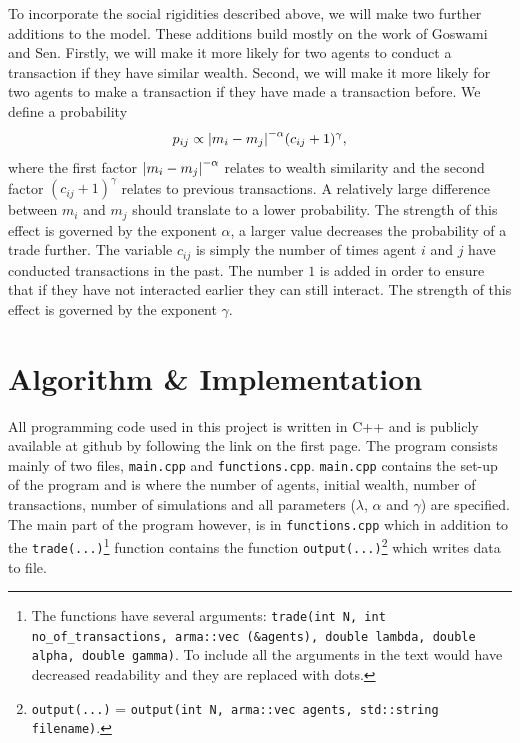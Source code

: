 \documentclass[10pt, a4paper]{amsart}
\begin{document}
To incorporate the social rigidities described above, we will make two further additions to the model. These additions build mostly on the work of Goswami and Sen\cite{GoswamiSen}. Firstly, we will make it more likely for two agents to conduct a transaction if they have similar wealth. Second, we will make it more likely for two agents to make a transaction if they have made a transaction before. We define a probability
\begin{equation}
\label{eq:rigidprob}
p_{ij} \propto \abs{m_i - m_j}^{-\alpha}(c_{ij}+1)^{\gamma},
\end{equation}
where the first factor $\abs{m_i-m_j}^{-\alpha}$ relates to wealth similarity and the second factor $(c_{ij}+1)^{\gamma}$ relates to previous transactions. A relatively large difference between $m_i$ and $m_j$ should translate to a lower probability. The strength of this effect is governed by the exponent $\alpha$, a larger value decreases the probability of a trade further. The variable $c_{ij}$ is simply the number of times agent $i$ and $j$ have conducted transactions in the past. The number $1$ is added in order to ensure that if they have not interacted earlier they can still interact. The strength of this effect is governed by the exponent $\gamma$.


\section{Algorithm \& Implementation}
All programming code used in this project is written in C++ and is publicly available at github by following the link on the first page. The program consists mainly of two files, \lstinline|main.cpp| and \lstinline|functions.cpp|. \lstinline|main.cpp| contains the set-up of the program and is where the number of agents, initial wealth, number of transactions, number of simulations and all parameters ($\lambda$, $\alpha$ and $\gamma$) are specified. The main part of the program however, is in \lstinline|functions.cpp| which in addition to the \lstinline|trade(...)|\footnote{The functions have several arguments: \lstinline|trade(int N, int no_of_transactions, arma::vec (&agents), double lambda, double alpha, double gamma)|. To include all the arguments in the text would have decreased readability and they are replaced with dots.} function contains the function \lstinline|output(...)|\footnote{\lstinline|output(...)| = \lstinline|output(int N, arma::vec agents, std::string filename)|.} which writes data to file.
\end{document}

